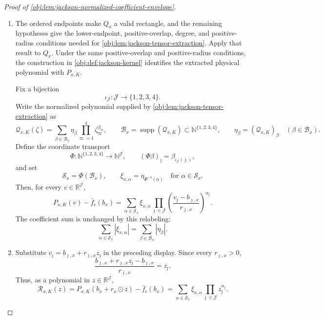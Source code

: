 \begin{proof}[Proof of \cref{obj:lem:jackson-normalized-coefficient-envelope}]
\begin{enumerate}
\item The ordered endpoints make \(Q_x\) a valid rectangle, and the remaining hypotheses give the lower-endpoint, positive-overlap, degree, and positive-radius conditions needed for \cref{obj:lem:jackson-tensor-extraction}. Apply that result to \(Q_x\). Under the same positive-overlap and positive-radius conditions, the construction in \cref{obj:def:jackson-kernel} identifies the extracted physical polynomial with \(P_{x,K}\).

Fix a bijection
\[
\iota_{\mathcal J}:\mathcal J\longrightarrow \{1,2,3,4\}.
\]
Write the normalized polynomial supplied by \cref{obj:lem:jackson-tensor-extraction} as
\[
\mathcal Q_{x,K}(\zeta)
=
\sum_{\beta\in\mathcal B_x}
\eta_\beta
\prod_{\varpi=1}^4 \zeta_\varpi^{\beta_\varpi},
\qquad
\mathcal B_x=\operatorname{supp}(\mathcal Q_{x,K})
\subset \mathbb N^{\{1,2,3,4\}},
\qquad
\eta_\beta=(\mathcal Q_{x,K})_\beta
\quad(\beta\in\mathcal B_x).
\]
Define the coordinate transport
\[
\Phi:\mathbb N^{\{1,2,3,4\}}\longrightarrow \mathbb N^{\mathcal J},
\qquad
(\Phi\beta)_\jmath=\beta_{\iota_{\mathcal J}(\jmath)},
\]
and set
\[
\mathcal S_x=\Phi(\mathcal B_x),
\qquad
\xi_{x,\alpha}=\eta_{\Phi^{-1}(\alpha)}
\quad\text{for }\alpha\in\mathcal S_x.
\]
Then, for every \(v\in\mathbb R^{\mathcal J}\),
\[
P_{x,K}(v)-\bar f_\epsilon(b_x)
=
\sum_{\alpha\in\mathcal S_x}
\xi_{x,\alpha}
\prod_{\jmath\in\mathcal J}
\left(\frac{v_\jmath-b_{\jmath,x}}{r_{\jmath,x}}\right)^{\alpha_\jmath}.
\]
The coefficient sum is unchanged by this relabeling:
\[
\sum_{\alpha\in\mathcal S_x}|\xi_{x,\alpha}|
=
\sum_{\beta\in\mathcal B_x}|\eta_\beta|.
\]

\item\label{proof:jackson-normalized-coefficient-envelope:normalized-expansion} Substitute \(v_\jmath=b_{\jmath,x}+r_{\jmath,x}z_\jmath\) in the preceding display. Since every \(r_{\jmath,x}>0\),
\[
\frac{b_{\jmath,x}+r_{\jmath,x}z_\jmath-b_{\jmath,x}}{r_{\jmath,x}}
=
z_\jmath .
\]
Thus, as a polynomial in \(z\in\mathbb R^{\mathcal J}\),
\[
\mathcal R_{x,K}(z)
=
P_{x,K}(b_x+r_x\odot z)-\bar f_\epsilon(b_x)
=
\sum_{\alpha\in\mathcal S_x}
\xi_{x,\alpha}
\prod_{\jmath\in\mathcal J}z_\jmath^{\alpha_\jmath}.
\]


\end{enumerate}
\end{proof}
